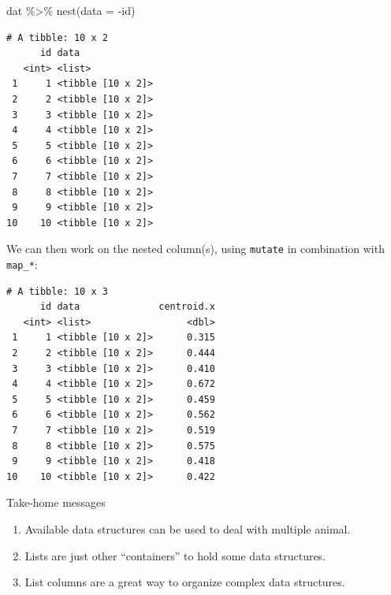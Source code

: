 \documentclass[ignorenonframetext,,t]{beamer}
\providecommand{\tightlist}{%
\setlength{\itemsep}{0pt}\setlength{\parskip}{0pt}}
\newenvironment{Shaded}{\begin{snugshade}}{\end{snugshade}}
\newcommand{\AttributeTok}[1]{\textcolor[rgb]{0.77,0.63,0.00}{#1}}
\newcommand{\FunctionTok}[1]{\textcolor[rgb]{0.00,0.00,0.00}{#1}}
\newcommand{\NormalTok}[1]{#1}
\newcommand{\SpecialCharTok}[1]{\textcolor[rgb]{0.00,0.00,0.00}{#1}}
\providecommand{\tightlist}{%
\setlength{\itemsep}{0pt}\setlength{\parskip}{0pt}}
\renewcommand{\tightlist}{\setlength{\itemsep}{1.4ex}\setlength{\parskip}{0pt}}
\begin{document}
\begin{frame}[fragile]
\begin{Shaded}
\begin{Highlighting}[]
\NormalTok{dat }\SpecialCharTok{\%\textgreater{}\%} \FunctionTok{nest}\NormalTok{(}\AttributeTok{data =} \SpecialCharTok{{-}}\NormalTok{id)}
\end{Highlighting}
\end{Shaded}

\begin{verbatim}
# A tibble: 10 x 2
      id data             
   <int> <list>           
 1     1 <tibble [10 x 2]>
 2     2 <tibble [10 x 2]>
 3     3 <tibble [10 x 2]>
 4     4 <tibble [10 x 2]>
 5     5 <tibble [10 x 2]>
 6     6 <tibble [10 x 2]>
 7     7 <tibble [10 x 2]>
 8     8 <tibble [10 x 2]>
 9     9 <tibble [10 x 2]>
10    10 <tibble [10 x 2]>
\end{verbatim}
\end{frame}

\begin{frame}[fragile]
We can then work on the nested column(s), using \texttt{mutate} in
combination with \texttt{map\_*}:

\begin{Shaded}
\end{Shaded}

\begin{verbatim}
# A tibble: 10 x 3
      id data              centroid.x
   <int> <list>                 <dbl>
 1     1 <tibble [10 x 2]>      0.315
 2     2 <tibble [10 x 2]>      0.444
 3     3 <tibble [10 x 2]>      0.410
 4     4 <tibble [10 x 2]>      0.672
 5     5 <tibble [10 x 2]>      0.459
 6     6 <tibble [10 x 2]>      0.562
 7     7 <tibble [10 x 2]>      0.519
 8     8 <tibble [10 x 2]>      0.575
 9     9 <tibble [10 x 2]>      0.418
10    10 <tibble [10 x 2]>      0.422
\end{verbatim}
\end{frame}

\begin{frame}{Take-home messages}
\protect\hypertarget{take-home-messages-2}{}
\begin{enumerate}
\tightlist
\item
  Available data structures can be used to deal with multiple animal.
\item
  Lists are just other ``containers'' to hold some data structures.
\item
  List columns are a great way to organize complex data structures.
\end{enumerate}
\end{frame}
\end{document}
